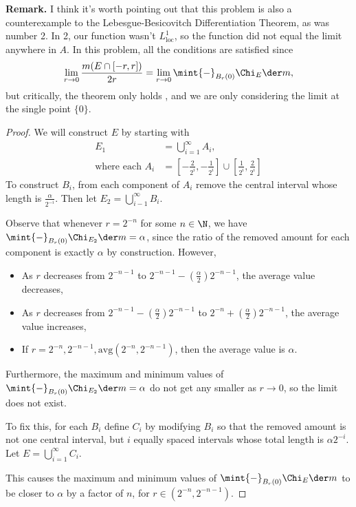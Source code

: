 \documentclass[12pt,letterpaper]{article}
\begin{document}
 
\textbf{Remark.} I think it's worth pointing out that this problem is also a counterexample to the Lebesgue-Besicovitch Differentiation Theorem, as was number 2. In 2, our function wasn't $L^{1}_{\text{loc}}$, so the function did not equal the limit anywhere in $A$. In this problem, all the conditions are satisfied since $$\lim_{r\to0}\frac{m(E\cap[-r,r])}{2r}=\lim_{r\to0}\mint{-}_{B_{r}(0)}\Chi_{E}\der m,$$ but critically, the theorem only holds \muae{}, and we are only considering the limit at the single point $\{0\}$. 

\begin{proof}
We will construct $E$ by starting with 
\begin{align*}
E_1&=\bigcup_{i=1}^{\infty} A_i, \\
\text{where each }A_i&=\left[-\frac{2}{2^i},-\frac{1}{2^i}\right]\cup\left[\frac{1}{2^i},\frac{2}{2^i}\right]
\end{align*}
To construct $B_i$, from each component of $A_i$ remove the central interval whose length is $\frac{\alpha}{2^{-i}}$. Then let $E_2=\bigcup_{i-1}^\infty	 B_i$. 


Observe that whenever $r=2^{-n}$ for some $n\in\N$, we have $\mint{-}_{B_{r}(0)}\Chi_{E_2}\der m=\alpha$, since the ratio of the removed amount for each component is exactly $\alpha$ by construction. However, 
\begin{itemize}
\item As $r$ decreases from $2^{-n-1}$ to 
$2^{-n-1}-\left(\frac{\alpha}{2}\right)2^{-n-1}$, the average value decreases,
\item As $r$ decreases from $2^{-n-1}-\left(\frac{\alpha}{2}\right)2^{-n-1}$ to $2^{-n}+\left(\frac{\alpha}{2}\right)2^{-n-1}$, the average value increases,
\item If $r=2^{-n},2^{-n-1},\text{avg}(2^{-n},2^{-n-1})$, then the average value is $\alpha$. 
\end{itemize}
Furthermore, the maximum and minimum values of $\mint{-}_{B_{r}(0)}\Chi_{E_2}\der m=\alpha$ do not get any smaller as $r\to0$, so the limit does not exist.

To fix this, for each $B_i$ define $C_i$ by modifying $B_i$ so that the removed amount is not one central interval, but $i$ equally spaced intervals whose total length is $\alpha2^{-i}$. Let $E=\bigcup_{i=1}^\infty C_i$. 


This causes the maximum and minimum values of $\mint{-}_{B_{r}(0)}\Chi_{E}\der m$ to be closer to $\alpha$ by a factor of $n$, for $r\in(2^{-n},2^{-n-1})$. 
\end{proof}
\end{document}
